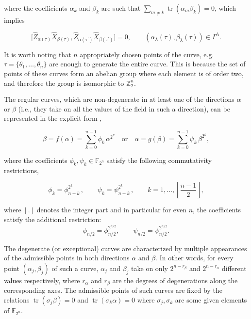 \documentclass[quantumrep,article,submit,pdftex,moreauthors]{Definitions/mdpi}
\DeclareMathOperator{\tr}{tr}
\begin{document}
where the coefficients $\alpha_k$ and $\beta_k$ are such that $\sum_{m \neq k}
\tr(\alpha_{m}\beta_{k})=0$, which implies

\begin{equation}
  \lbrack
  \hat{Z}_{\alpha (\tau )}\hat{X}_{\beta (\tau )},
  \hat{Z}_{\alpha (\tau^{\prime })}\hat{X}_{\beta(\tau^{\prime})}
  ] = 0, \qquad \left(
    \alpha_{\lambda}(\tau),\beta_{\lambda}(\tau)
  \right) \in \Gamma ^{\lambda }.
  \label{stab}
\end{equation}

It is worth noting that $n$ appropriately chosen points of the curve, e.g. $\tau
= \{\theta _{1},\ldots,\theta_{n}\}$ are enough to generate the entire curve.
This is because the set of points of these curves form an abelian group where
each element is of order two, and therefore the group is isomorphic to $\mathbb
Z_{2}^n$.

The regular curves, which are non-degenerate in at least one of the directions
$\alpha$ or $\beta$ (i.e., they take on all the values of the field in such a
direction), can be represented in the explicit form \cite{GS2},

\begin{equation}
  \beta = f(\alpha) = \sum_{k=0}^{n-1} \phi_{k} \, \alpha^{2^{k}}
  \quad \text{or}
  \quad \alpha = g(\beta) = \sum_{k=0}^{n-1} \psi_{k}\,\beta^{2^{k}},
  \label{RC}
\end{equation}

where the coefficients $\phi_{k},\psi_{k} \in \mathbb{F}_{2^{n}}$ satisfy the
following commutativity restrictions,

\begin{equation}
  \phi_{k}
  = \phi _{n-k}^{2^{k}}\,, \qquad \psi_{k}
  = \psi_{n-k}^{2^{k}}\,, \qquad k=1,\ldots,
  \left\lfloor \frac{n-1}{2}\right\rfloor,
  \label{Acc}
\end{equation}

where $\left\lfloor . \right\rfloor$ denotes the integer part and in particular
for even $n$, the coefficients satisfy the additional restriction:
\begin{equation}
  \phi_{n/2}
  = \phi_{n/2}^{2^{n/2}}, \qquad \psi_{n/2}
  = \psi_{n/2}^{2^{n/2}}.
\end{equation}

The degenerate (or exceptional) curves are characterized by multiple appearances
of the admissible points in both directions $\alpha $ and $\beta$. In other
words, for every point $(\alpha_{j},\beta_{j})$ of such a curve, $\alpha_{j}$ and
$\beta_{j}$ take on only $2^{n-r_{\beta }}$ and $2^{n-r_{\alpha}}$ different
values respectively, where $r_{\alpha }$ and $r_{\beta }$ are the degrees of
degenerations along the corresponding axes. The admissible points of such curves
are fixed by the relations $\tr(\sigma_{j}\beta)=0$ and
$\tr(\sigma_{k}\alpha)=0$ where $\sigma_{j}, \sigma_{k}$ are some given elements
of $\mathbb{F}_{2^{n}}$.
\end{document}

